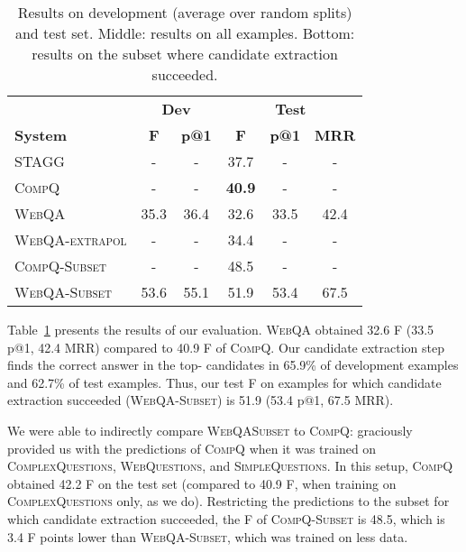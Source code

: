 \documentclass[11pt,a4paper]{article}
\begin{document}
\begin{table}[t]
\begin{center}
\scriptsize{
\begin{tabular}{l|c|c|c|c|c|}
 \toprule
 & \multicolumn{2}{c|}{\textbf{Dev}} & \multicolumn{3}{c|}{\textbf{Test}}\\ 
 \textbf{System} & \textbf{F} & \textbf{p@1} & \textbf{F} & \textbf{p@1} & \textbf{MRR} \\ 
 \midrule
\textsc{STAGG} & - & -  & 37.7 & - & -   \\ 
\textsc{CompQ} & - & - & \textbf{40.9} & - & -  \\ 
\midrule
\textsc{WebQA} & 35.3 & 36.4 & 32.6  & 33.5 & 42.4    \\
\textsc{WebQA-extrapol} & - & - & 34.4 & - & -   \\
\midrule
\textsc{CompQ-Subset} & - & - & 48.5 & - & -   \\
\textsc{WebQA-Subset}  & 53.6 & 55.1 & 51.9 & 53.4 & 67.5  \\
\toprule
\end{tabular}}
\end{center}
\caption{Results on development (average over random splits) and test set. Middle: results on all examples. Bottom: results on the subset where candidate extraction succeeded.}
\label{tab:results}
\end{table}

Table~\ref{tab:results} presents the results of our evaluation. \textsc{WebQA} obtained 32.6 F (33.5 p@1, 42.4 MRR) compared to 40.9 F of \textsc{CompQ}. Our candidate extraction step finds the correct answer in the top- candidates in 65.9\% of development examples and 62.7\% of test examples. Thus, our test F on examples for which candidate extraction succeeded (\textsc{WebQA-Subset}) is 51.9 (53.4 p@1, 67.5 MRR).

We were able to indirectly compare \textsc{WebQASubset} to \textsc{CompQ}: 
 graciously provided us with the predictions of \textsc{CompQ} when it was trained on \textsc{ComplexQuestions}, \textsc{WebQuestions}, and \textsc{SimpleQuestions}. In this setup, \textsc{CompQ} obtained 42.2 F on the test set (compared to 40.9 F, when training on \textsc{ComplexQuestions} only, as we do). Restricting the predictions to the subset for which candidate extraction succeeded, the F of \textsc{CompQ-Subset} is 48.5, which is 3.4 F points lower than \textsc{WebQA-Subset}, which was trained on less data.
\end{document}
